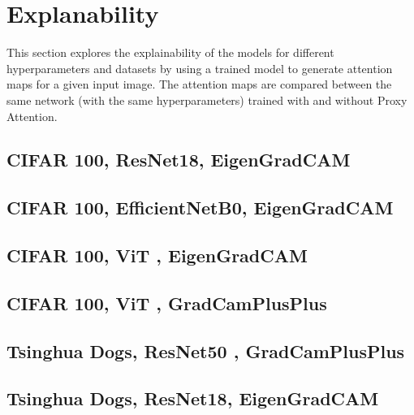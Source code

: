 \section{Explanability}
This section explores the explainability of the models for different hyperparameters and datasets by using a trained model to generate attention maps for a given input image. The attention maps are compared between the same network (with the same hyperparameters) trained with and without Proxy Attention.

\subsection{CIFAR 100, ResNet18, EigenGradCAM}


\subsection{CIFAR 100, EfficientNetB0, EigenGradCAM}


\subsection{CIFAR 100, ViT , EigenGradCAM}


\subsection{CIFAR 100, ViT , GradCamPlusPlus}


\subsection{Tsinghua Dogs, ResNet50 , GradCamPlusPlus}


\subsection{Tsinghua Dogs, ResNet18, EigenGradCAM}

